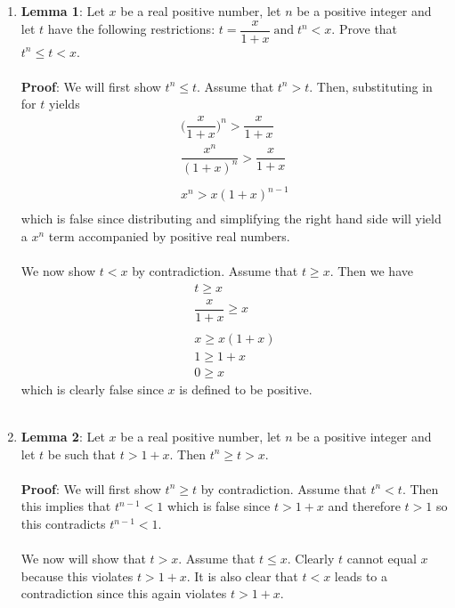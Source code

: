 \documentclass[12pt]{article}
\begin{document}
\begin{enumerate}
\item \textbf{Lemma 1}: Let $x$ be a real positive number, let $n$ be a positive integer and let $t$ have the following restrictions: $t=\dfrac{x}{1+x} \; \text{and} \; t^{n}<x$. Prove that $t^{n} \leq t < x$. \\ \\


\textbf{Proof}: We will first show $t^{n} \leq t$. Assume that $t^{n} > t$. Then, substituting in for $t$ yields 
\begin{align*}
\bigg (\dfrac{x}{1+x} \bigg )^{n} > \dfrac{x}{1+x} \\
\dfrac{x^{n}}{(1+x)^{n}}  >  \dfrac{x}{1+x} \\ \\
x^{n} > x(1+x)^{n-1} \\
\end{align*}
which is false since distributing and simplifying the right hand side will yield a $x^{n}$ term accompanied by positive real numbers.  \\ \\ 

We now show $t < x$ by contradiction. Assume that $t \geq x$. Then we have \begin{align*}
t \geq x \\
\dfrac{x}{1+x} \geq x \\ \\
x \geq x(1+x) \\
1 \geq 1+x \\
0 \geq x
\end{align*}
which is clearly false since $x$ is defined to be positive.\\ \\


\item \textbf{Lemma 2}: Let $x$ be a real positive number, let $n$ be a positive integer and let $t$ be such that $t>1+x$. Then $t^{n} \geq t > x$. \\ \\


\textbf{Proof}: We will first show $t^{n} \geq t$ by contradiction. Assume that $t^{n}<t$. Then this implies that $t^{n-1}<1$ which is false since $t>1+x$ and therefore $t>1$ so this contradicts $t^{n-1}<1$. \\ \\

We now will show that  $t > x$. Assume that $t \leq x$. Clearly $t$ cannot equal $x$ because this violates $t>1+x$. It is also clear that $t < x$ leads to a contradiction since this again violates $t>1+x$.\\ \\ 



\end{enumerate}
\end{document}
